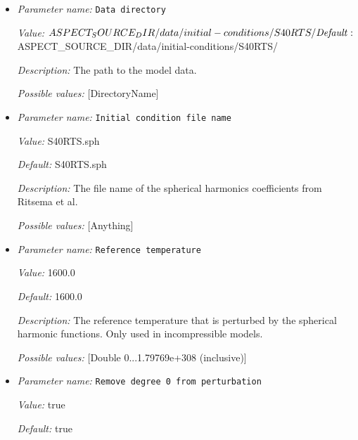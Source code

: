 \begin{itemize}
\item {\it Parameter name:} {\tt Data directory}
\label{parameters:Initial conditions/S40RTS perturbation/Data directory}


{\it Value:} $ASPECT_SOURCE_DIR/data/initial-conditions/S40RTS/


{\it Default:} $ASPECT_SOURCE_DIR/data/initial-conditions/S40RTS/


{\it Description:} The path to the model data. 


{\it Possible values:} [DirectoryName]
\item {\it Parameter name:} {\tt Initial condition file name}
\label{parameters:Initial conditions/S40RTS perturbation/Initial condition file name}


{\it Value:} S40RTS.sph


{\it Default:} S40RTS.sph


{\it Description:} The file name of the spherical harmonics coefficients from Ritsema et al.


{\it Possible values:} [Anything]
\item {\it Parameter name:} {\tt Reference temperature}
\label{parameters:Initial conditions/S40RTS perturbation/Reference temperature}


{\it Value:} 1600.0


{\it Default:} 1600.0


{\it Description:} The reference temperature that is perturbed by the spherical harmonic functions. Only used in incompressible models.


{\it Possible values:} [Double 0...1.79769e+308 (inclusive)]
\item {\it Parameter name:} {\tt Remove degree 0 from perturbation}
\label{parameters:Initial conditions/S40RTS perturbation/Remove degree 0 from perturbation}


{\it Value:} true


{\it Default:} true



\end{itemize}
